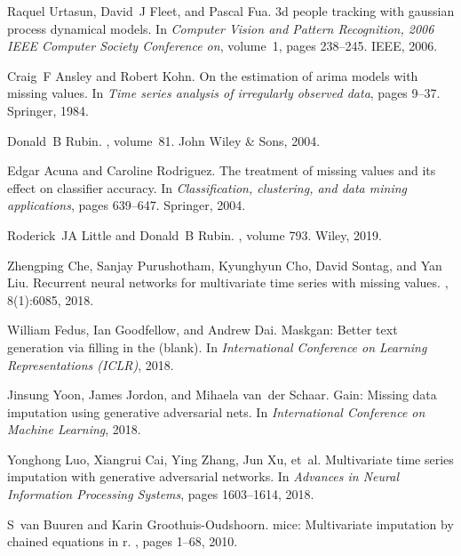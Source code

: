 \documentclass{article}
\begin{document}
\begin{thebibliography}{10}

Raquel Urtasun, David~J Fleet, and Pascal Fua.
\newblock 3d people tracking with gaussian process dynamical models.
\newblock In {\em Computer Vision and Pattern Recognition, 2006 IEEE Computer
  Society Conference on}, volume~1, pages 238--245. IEEE, 2006.

Craig~F Ansley and Robert Kohn.
\newblock On the estimation of arima models with missing values.
\newblock In {\em Time series analysis of irregularly observed data}, pages
  9--37. Springer, 1984.

Donald~B Rubin.
, volume~81.
\newblock John Wiley \& Sons, 2004.

Edgar Acuna and Caroline Rodriguez.
\newblock The treatment of missing values and its effect on classifier
  accuracy.
\newblock In {\em Classification, clustering, and data mining applications},
  pages 639--647. Springer, 2004.

Roderick~JA Little and Donald~B Rubin.
, volume 793.
\newblock Wiley, 2019.

Zhengping Che, Sanjay Purushotham, Kyunghyun Cho, David Sontag, and Yan Liu.
\newblock Recurrent neural networks for multivariate time series with missing
  values.
, 8(1):6085, 2018.

William Fedus, Ian Goodfellow, and Andrew Dai.
\newblock Maskgan: Better text generation via filling in the (blank).
\newblock In {\em International Conference on Learning Representations (ICLR)},
  2018.

Jinsung Yoon, James Jordon, and Mihaela van~der Schaar.
\newblock Gain: Missing data imputation using generative adversarial nets.
\newblock In {\em International Conference on Machine Learning}, 2018.

Yonghong Luo, Xiangrui Cai, Ying Zhang, Jun Xu, et~al.
\newblock Multivariate time series imputation with generative adversarial
  networks.
\newblock In {\em Advances in Neural Information Processing Systems}, pages
  1603--1614, 2018.

S~van Buuren and Karin Groothuis-Oudshoorn.
\newblock mice: Multivariate imputation by chained equations in r.
, pages 1--68, 2010.


\end{thebibliography}
\end{document}
